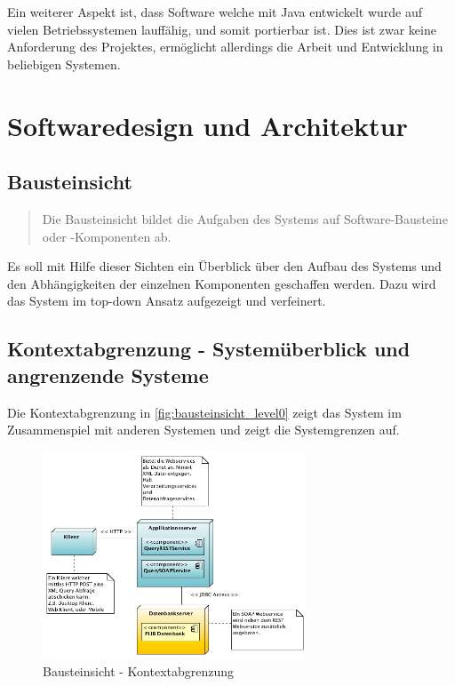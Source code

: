 Ein weiterer Aspekt ist, dass Software welche mit Java entwickelt wurde auf vielen Betriebssystemen lauffähig, und somit portierbar ist. Dies ist zwar keine Anforderung des Projektes, ermöglicht allerdings die Arbeit und Entwicklung in beliebigen Systemen. 

\section{Softwaredesign und Architektur}

\subsection{Bausteinsicht}
\begin{quotation}
Die Bausteinsicht bildet die Aufgaben des Systems auf Software-Bausteine oder -Komponenten ab.
 \citep[S. 98ff][]{starke}	
\end{quotation}

Es soll mit Hilfe dieser Sichten ein Überblick über den Aufbau des Systems und den Abhängigkeiten der einzelnen Komponenten geschaffen werden. Dazu wird das System im top-down Ansatz aufgezeigt und verfeinert. 

\subsection{Kontextabgrenzung - Systemüberblick und angrenzende Systeme}

Die Kontextabgrenzung in \autoref{fig:bausteinsicht_level0} zeigt das System im Zusammenspiel mit anderen Systemen und zeigt die Systemgrenzen auf. 

\begin{figure}[!htbp]
	\centering
		\includegraphics[width=0.7\textwidth]{images/bausteinsicht_plib_level0.jpg}
	\caption{Bausteinsicht - Kontextabgrenzung}
	\label{fig:bausteinsicht_level0}
\end{figure}

